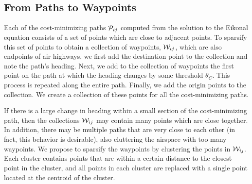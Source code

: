 \subsection{From Paths to Waypoints}
Each of the cost-minimizing paths $\mathcal{P}_{ij}$ computed from the solution to the Eikonal equation consists of a set of points which are close to adjacent points. To sparsify this set of points to obtain a collection of waypoints, $\mathcal{W}_{ij}$, which are also endpoints of air highways, we first add the destination point to the collection and note the path's heading. Next, we add to the collection of waypoints the first point on the path at which the heading changes by some threshold $\theta_C$. This process is repeated along the entire path. Finally, we add the origin points to the collection. We create a collection of these points for all the cost-minimizing paths.

If there is a large change in heading within a small section of the cost-minimizing path, then the collections $\mathcal{W}_{ij}$ may contain many points which are close together. In addition, there may be multiple paths that are very close to each other (in fact, this behavior is desirable), also cluttering the airspace with too many waypoints. We propose to sparsify the waypoints by clustering the points in $\mathcal{W}_{ij}$. Each cluster contains points that are within a certain distance to the closest point in the cluster, and all points in each cluster are replaced with a single point located at the centroid of the cluster.